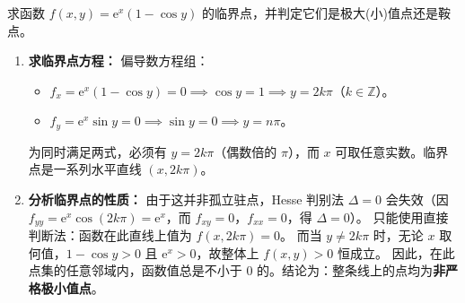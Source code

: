 \documentclass[lang=cn,11pt]{elegantbook}
\begin{document}
\begin{exercise}[含指数与三角的极值判定]
求函数 $f(x,y)=\mathrm{e}^x(1-\cos y)$ 的临界点，并判定它们是极大(小)值点还是鞍点。
\end{exercise}
\begin{solution}
\begin{enumerate}
  \item \textbf{求临界点方程：}
  偏导数方程组：
  \begin{itemize}
    \item $f_x = \mathrm{e}^x(1-\cos y) = 0 \implies \cos y = 1 \implies y = 2k\pi$（$k \in \mathbb Z$）。
    \item $f_y = \mathrm{e}^x\sin y = 0 \implies \sin y = 0 \implies y = n\pi$。
  \end{itemize}
  为同时满足两式，必须有 $y = 2k\pi$（偶数倍的 $\pi$），而 $x$ 可取任意实数。临界点是一系列水平直线 $(x, 2k\pi)$。

  \item \textbf{分析临界点的性质：}
  由于这并非孤立驻点，Hesse 判别法 $\Delta=0$ 会失效（因 $f_{yy}=\mathrm{e}^x\cos(2k\pi)=\mathrm{e}^x$，而 $f_{xy}=0$，$f_{xx}=0$，得 $\Delta=0$）。
  只能使用直接判断法：函数在此直线上值为 $f(x, 2k\pi) = 0$。
  而当 $y \neq 2k\pi$ 时，无论 $x$ 取何值，$1-\cos y > 0$ 且 $\mathrm{e}^x > 0$，故整体上 $f(x,y) > 0$ 恒成立。
  因此，在此点集的任意邻域内，函数值总是不小于 0 的。结论为：整条线上的点均为\textbf{非严格极小值点}。
\end{enumerate}
\end{solution}
\end{document}
